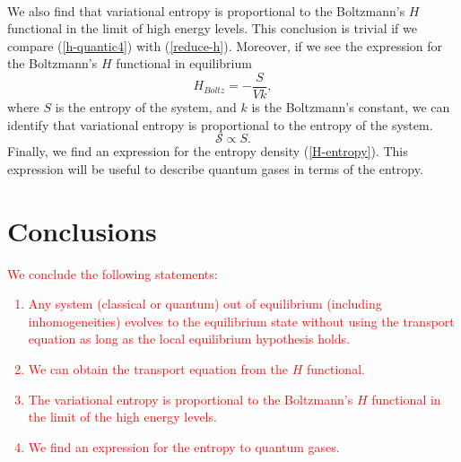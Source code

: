 \documentclass{article}
\newcommand{\Ss}{\mathcal{S}}
\begin{document}
{\\
We also find that variational entropy is proportional to the Boltzmann's $H$ functional in the limit of high energy levels. This conclusion is trivial if we compare (\ref{h-quantic4}) with (\ref{reduce-h}). Moreover, if we see the expression for the Boltzmann's $H$ functional in equilibrium
\begin{equation}
    H_{Boltz}=-\frac{S}{Vk},
\end{equation}
where $S$ is the entropy of the system, and $k$ is the Boltzmann's constant, we can identify that variational entropy is proportional to the entropy of the system.\\
\begin{equation}
    \Ss\propto S.
\end{equation}
Finally, we find an expression for the entropy density (\ref{H-entropy}). This expression will be useful to describe quantum gases in terms of the entropy.}


\section{Conclusions}
\textcolor{red}{We conclude the following statements:\\
\begin{enumerate}
    \item Any system (classical or quantum) out of equilibrium (including inhomogeneities) evolves to the equilibrium state without using the transport equation as long as the local equilibrium hypothesis holds.
    \item We can obtain the transport equation from the $H$ functional.
    \item The variational entropy is proportional to the Boltzmann's $H$ functional in the limit of the high energy levels.
    \item We find an expression for the entropy to quantum gases.
    \end{enumerate}
  }
  
\clearpage
\end{document}
